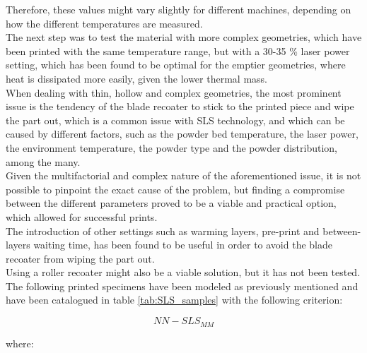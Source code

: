 \documentclass[a4paper]{article}
\begin{document}
          Therefore, these values might vary slightly for different machines, depending on how the different 
          temperatures are measured. \\ 
  
          The next step was to test the material with more complex geometries, which have been printed with the same 
          temperature range, but with a 30-35 \% laser power setting, which has been found to be optimal for the 
          emptier geometries, where heat is dissipated more easily, given the lower thermal mass. \\ 
  
          When dealing with thin, hollow and complex geometries, the most prominent issue is the tendency of the 
          blade recoater to stick to the printed piece and wipe the part out, which is a common 
          issue with SLS technology, and which 
          can be caused by different factors, such as the powder bed temperature, the laser power, the 
          environment temperature, the powder type and the powder distribution, among the many. \\ 
  
          Given the multifactorial and complex nature of the aforementioned issue, it is not possible to 
          pinpoint the exact cause of the problem, but finding a compromise between the 
          different parameters proved to be a viable and practical option, which allowed for successful prints. \\
          
          The introduction of other settings such as warming layers, pre-print 
          and between-layers waiting time, has been found to be useful in order to avoid 
          the blade recoater from wiping the part out. \\
  
          Using a roller recoater might also be a viable solution, but it has not been tested. \\ 
  
          The following printed specimens have been modeled as previously mentioned and 
          have been catalogued in table \ref{tab:SLS_samples} with the following criterion: 
  
          \begin{equation}
              NN-SLS_{MM}
              \label{eq:SLS_specimen_notation}
          \end{equation}
  
          where: 
  
\end{document}
